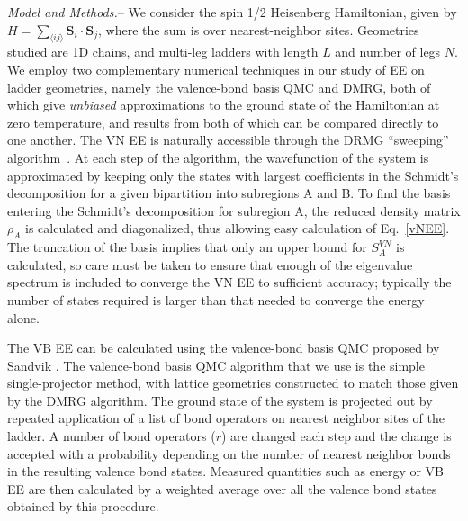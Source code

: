 \documentclass[prl,aps,twocolumn,floatfix,amsmath,amssymb,superscriptaddress,tightenlines]{revtex4}
\begin{document}
{\it Model and Methods.}-- We consider the spin 1/2 Heisenberg
Hamiltonian, given by  $H =  \sum_{\langle i j \rangle} {\mathbf S}_i
\cdot {\mathbf S}_j \label{ham}$, where the sum is over nearest-neighbor
sites.  Geometries studied are 1D chains, and multi-leg ladders with
length $L$ and number of legs $N$.  
We employ two complementary numerical techniques in our study of EE on
ladder geometries, namely the valence-bond basis QMC and DMRG, both of
which give {\it unbiased} approximations to the ground state of the
Hamiltonian at zero temperature, and results from both of which can be
compared directly to one another.  The VN EE is naturally accessible
through the DRMG ``sweeping'' algorithm~\cite{White92, Scholl05}.  At each
step of the algorithm, the wavefunction of the system is approximated by
keeping only the states with largest coefficients in the Schmidt's
decomposition for a given bipartition into subregions A and B. To find the
basis entering the Schmidt's decomposition for subregion A, the reduced
density matrix $\rho_A$ is calculated and diagonalized, thus allowing easy
calculation of Eq.~\eqref{vNEE}. The truncation of the basis implies that
only an upper bound for $S^{VN}_{A}$ is calculated, so care must be taken
to ensure that enough of the eigenvalue spectrum is included to converge
the VN EE to sufficient accuracy; typically the number of states required
is larger than that needed to converge the energy alone.

The VB EE \cite{Alet,Chh} can be calculated using the valence-bond basis
QMC proposed by Sandvik \cite{Sandvik}.  The valence-bond basis QMC
algorithm that we use is the simple single-projector method, with lattice
geometries constructed to match those given by the DMRG algorithm.  The
ground state of the system is projected out by repeated application of a
list of bond operators on nearest neighbor sites of the ladder.  A number
of bond operators ($r$) are changed each step and the change is accepted
with a probability depending on the number of nearest neighbor bonds in
the resulting valence bond states. Measured quantities such as energy or
VB EE are then calculated by a weighted average over all the valence bond
states obtained by this procedure.
\end{document}
